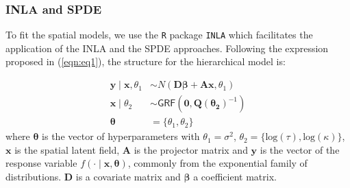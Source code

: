 \documentclass{article}
\begin{document}
\subsubsection{INLA and SPDE}

To fit the spatial models, we use the \texttt{R} package \texttt{INLA} which facilitates the application of the INLA and the SPDE approaches. Following the expression proposed in (\ref{eqn:eq1}), the structure for the hierarchical model is: %



\begin{align}
\mathbf{y} \mid \mathbf{x}, \theta_{1} & \sim N(\boldsymbol{D\beta} + \mathbf{A} \mathbf{x}, \theta_{1}) \label{eqn:eq3}\\
\mathbf{x} \mid \theta_{2} & \sim \mathsf{GRF}(\boldsymbol{0}, \boldsymbol{Q(\theta_{2})}^{-1}) \label{eqn:eq4}\\
\boldsymbol{\theta} & = \{\theta_{1}, \theta_{2}\}\label{eqn:eq5}
\end{align}
where $\boldsymbol{\theta}$ is the vector of hyperparameters with $\theta_{1} = \sigma^{2}$, $\theta_{2} = \{\text{log}(\tau), \text{log}(\kappa)\}$, $\boldsymbol{x}$ is the spatial latent field, $\boldsymbol{A}$ is the projector matrix and $\boldsymbol{y}$ is the vector of the response variable $f(\cdot \mid \boldsymbol{x}, \boldsymbol{\theta})$, commonly from the exponential family of distributions. $\boldsymbol{D}$ is a covariate matrix and $\boldsymbol{\beta}$ a coefficient matrix. 
\end{document}
